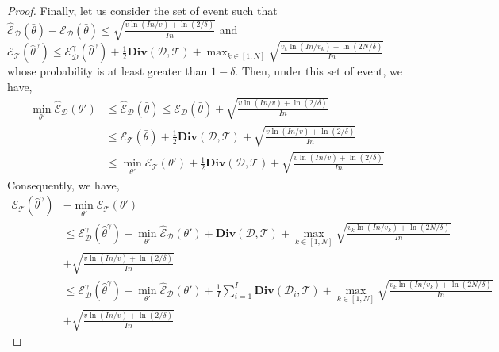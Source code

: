 \begin{proof}
Finally, let us consider the set of event such that $\hat{\mathcal{E}}_{\mathcal{D}}(\bar{\theta}) - \mathcal{E}_{\mathcal{D}}(\bar{\theta}) \leq \sqrt{\frac{v\ln\left(In/v\right) + \ln\left(2/\delta\right)}{In}}$ and $\mathcal{E}_{\mathcal{T}}(\hat{\theta}^{\gamma}) \leq \mathcal{E}_{\mathcal{D}}^{\gamma}(\hat{\theta}^{\gamma}) + \frac{1}{2}\mathbf{Div}(\mathcal{D},\mathcal{T}) + \max_{k\in[1,N]} \sqrt{\frac{v_{k}\ln\left(In/v_{k}\right)+\ln(2N/\delta)}{In}}$ whose probability is at least greater than $1-\delta$.
Then, under this set of event, we have,
\begin{align}
    \min_{\theta'}\hat{\mathcal{E}}_{\mathcal{D}}(\theta') &\leq \hat{\mathcal{E}}_{\mathcal{D}}(\bar{\theta})\leq \mathcal{E}_{\mathcal{D}}(\bar{\theta}) +\sqrt{\frac{v\ln\left(In/v\right) + \ln\left(2/\delta\right)}{In}}\\
    &\leq \mathcal{E}_{\mathcal{T}}(\bar{\theta})+ \frac{1}{2}\mathbf{Div}(\mathcal{D}, \mathcal{T}) +\sqrt{\frac{v\ln\left(In/v\right) + \ln\left(2/\delta\right)}{In}}\\
    &\leq \min_{\theta'}\mathcal{E}_{\mathcal{T}}\left(\theta'\right) + \frac{1}{2}\mathbf{Div}(\mathcal{D}, \mathcal{T}) + \sqrt{\frac{v\ln\left(In/v\right) + \ln\left(2/\delta\right)}{In}}
\end{align}
Consequently, we have,
\begin{align}
\mathcal{E}_{\mathcal{T}}(\hat{\theta}^{\gamma})& - \min_{\theta'}\mathcal{E}_{\mathcal{T}}\left(\theta'\right) \nonumber \\
&\leq \mathcal{E}_{\mathcal{D}}^{\gamma}(\hat{\theta}^{\gamma}) - \min_{\theta'}\hat{\mathcal{E}}_{\mathcal{D}}\left(\theta'\right) + \mathbf{Div}(\mathcal{D}, \mathcal{T}) + \max_{k\in[1,N]} \sqrt{\frac{v_{k}\ln\left(In/v_{k}\right)+\ln(2N/\delta)}{In}} \nonumber \\
&+ \sqrt{\frac{v\ln\left(In/v\right) + \ln\left(2/\delta\right)}{In}}\\
&\leq \mathcal{E}_{\mathcal{D}}^{\gamma}(\hat{\theta}^{\gamma}) - \min_{\theta'}\hat{\mathcal{E}}_{\mathcal{D}}\left(\theta'\right) + \frac{1}{I}\sum_{i=1}^{I}\mathbf{Div}(\mathcal{D}_{i}, \mathcal{T}) + \max_{k\in[1,N]} \sqrt{\frac{v_{k}\ln\left(In/v_{k}\right)+\ln(2N/\delta)}{In}} \nonumber \\
&+ \sqrt{\frac{v\ln\left(In/v\right) + \ln\left(2/\delta\right)}{In}}
\end{align}
\end{proof}


